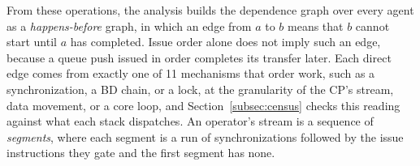 From these operations, the analysis builds the dependence graph over every agent as a \emph{happens-before} graph, in which an edge from $a$ to $b$ means that $b$ cannot start until $a$ has completed.
Issue order alone does not imply such an edge, because a queue push issued in order completes its transfer later.
Each direct edge comes from exactly one of 11 mechanisms that order work, such as a synchronization, a BD chain, or a lock, at the granularity of the CP's stream, data movement, or a core loop, and Section~\ref{subsec:census} checks this reading against what each stack dispatches.
An operator's stream is a sequence of \emph{segments}, where each segment is a run of synchronizations followed by the issue instructions they gate and the first segment has none.

